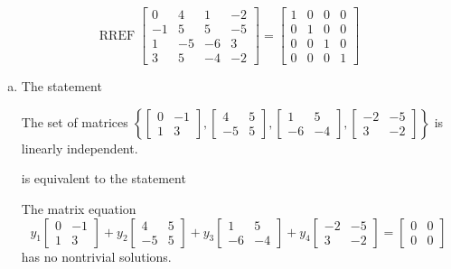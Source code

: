 \begin{exerciseAnswer} 


\[\operatorname{RREF} \left[\begin{array}{cccc}
0 & 4 & 1 & -2 \\
-1 & 5 & 5 & -5 \\
1 & -5 & -6 & 3 \\
3 & 5 & -4 & -2
\end{array}\right] = \left[\begin{array}{cccc}
1 & 0 & 0 & 0 \\
0 & 1 & 0 & 0 \\
0 & 0 & 1 & 0 \\
0 & 0 & 0 & 1
\end{array}\right] \]


\begin{enumerate}[(a)]
\item The statement 
\begin{center}\begin{minipage}{0.8\textwidth}
 The set of matrices \( \left\{ \left[\begin{array}{cc}
0 & -1 \\
1 & 3
\end{array}\right] , \left[\begin{array}{cc}
4 & 5 \\
-5 & 5
\end{array}\right] , \left[\begin{array}{cc}
1 & 5 \\
-6 & -4
\end{array}\right] , \left[\begin{array}{cc}
-2 & -5 \\
3 & -2
\end{array}\right] \right\} \) is linearly independent.
\end{minipage}\end{center}
     is equivalent to the statement 
\begin{center}\begin{minipage}{0.8\textwidth}
 The matrix equation \[ y_{1} \left[\begin{array}{cc}
0 & -1 \\
1 & 3
\end{array}\right] + y_{2} \left[\begin{array}{cc}
4 & 5 \\
-5 & 5
\end{array}\right] + y_{3} \left[\begin{array}{cc}
1 & 5 \\
-6 & -4
\end{array}\right] + y_{4} \left[\begin{array}{cc}
-2 & -5 \\
3 & -2
\end{array}\right] = \left[\begin{array}{cc}
0 & 0 \\
0 & 0
\end{array}\right] \] has no nontrivial solutions. 
\end{minipage}\end{center}
    

\end{enumerate}
\end{exerciseAnswer}
